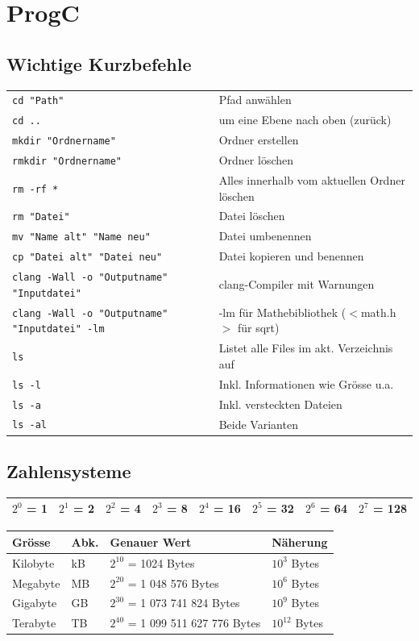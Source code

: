 \section{ProgC}

    \subsection{Wichtige Kurzbefehle}
		\begin{tabular}{ll}
			\verb|cd "Path"| & Pfad anwählen \\
			\verb|cd ..| & um eine Ebene nach oben (zurück) \\
			\verb|mkdir "Ordnername"| & Ordner erstellen \\
			\verb|rmkdir "Ordnername"| & Ordner löschen \\
			\verb|rm -rf *| & Alles innerhalb vom aktuellen Ordner löschen \\
			\verb|rm "Datei"| & Datei löschen \\
			\verb|mv "Name alt" "Name neu"| & Datei umbenennen \\
			\verb|cp "Datei alt" "Datei neu"| & Datei kopieren und benennen \\
			\verb|clang -Wall -o "Outputname" "Inputdatei"| & clang-Compiler mit Warnungen \\
			\verb|clang -Wall -o "Outputname" "Inputdatei" -lm| & -lm für Mathebibliothek ($<$math.h$>$ für sqrt)\\
			\verb|ls| & Listet alle Files im akt. Verzeichnis auf \\
			\verb|ls -l| & Inkl. Informationen wie Grösse u.a. \\
			\verb|ls -a| & Inkl. versteckten Dateien \\
			\verb|ls -al| & Beide Varianten \\
		\end{tabular}

	\subsection{Zahlensysteme}
		\begin{tabular}{|l|l|l|l|l|l|l|l|}
			\hline
			$2^0$ = 1 & $2^1$ = 2 & $2^2$ = 4 & $2^3$ = 8 & $2^4$ = 16 & $2^5$ = 32 & $2^6$ = 64 & $2^7$ = 128 \\
			\hline
		\end{tabular}

		\begin{tabular}{|l|l|l|l|}
			\hline
			\textbf{Grösse} & \textbf{Abk.} & \textbf{Genauer Wert} & \textbf{Näherung} \\
			\hline
			Kilobyte & kB & $2^{10}$ = 1024 Bytes & $10^3$ Bytes \\
			\hline
			Megabyte & MB & $2^{20}$ = 1 048 576 Bytes & $10^6$ Bytes \\
			\hline
			Gigabyte & GB & $2^{30}$ = 1 073 741 824 Bytes & $10^9$ Bytes \\
			\hline
			Terabyte & TB & $2^{40}$ = 1 099 511 627 776 Bytes & $10^12$ Bytes \\ 
			\hline
		\end{tabular}

